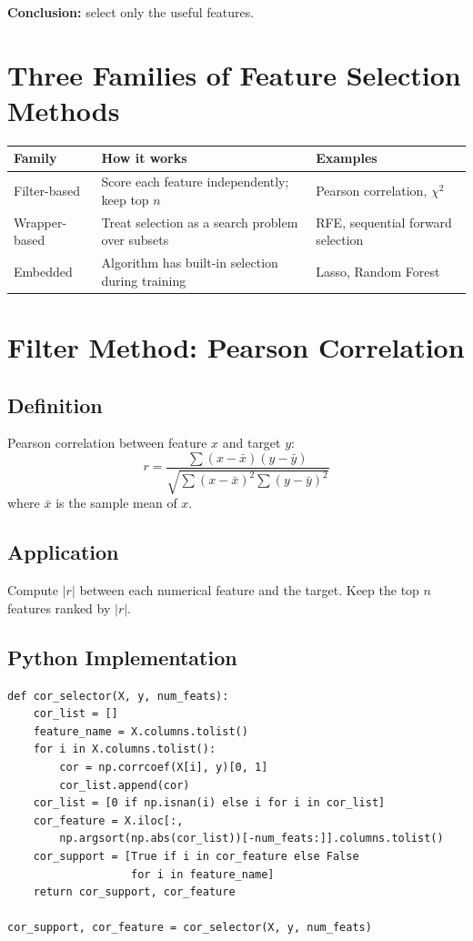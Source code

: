 \documentclass[11pt]{article}
\begin{document}
\textbf{Conclusion:} select only the useful features.


\newpage
\section{Three Families of Feature Selection Methods}

\begin{center}
\begin{tabular}{@{}lll@{}}
\toprule
\textbf{Family} & \textbf{How it works} & \textbf{Examples} \\
\midrule
Filter-based  & Score each feature independently; keep top $n$ & Pearson correlation, $\chi^2$ \\
Wrapper-based & Treat selection as a search problem over subsets & RFE, sequential forward selection \\
Embedded      & Algorithm has built-in selection during training & Lasso, Random Forest \\
\bottomrule
\end{tabular}
\end{center}


\newpage
\section{Filter Method: Pearson Correlation}

\subsection{Definition}
Pearson correlation between feature $x$ and target $y$:
\[
r = \frac{\sum (x - \bar{x})(y - \bar{y})}
         {\sqrt{\sum (x - \bar{x})^2 \sum (y - \bar{y})^2}}
\]
where $\bar{x}$ is the sample mean of $x$.

\subsection{Application}
Compute $|r|$ between each numerical feature and the target.
Keep the top $n$ features ranked by $|r|$.

\subsection{Python Implementation}
\begin{verbatim}
def cor_selector(X, y, num_feats):
    cor_list = []
    feature_name = X.columns.tolist()
    for i in X.columns.tolist():
        cor = np.corrcoef(X[i], y)[0, 1]
        cor_list.append(cor)
    cor_list = [0 if np.isnan(i) else i for i in cor_list]
    cor_feature = X.iloc[:,
        np.argsort(np.abs(cor_list))[-num_feats:]].columns.tolist()
    cor_support = [True if i in cor_feature else False
                   for i in feature_name]
    return cor_support, cor_feature

cor_support, cor_feature = cor_selector(X, y, num_feats)
\end{verbatim}
\end{document}
